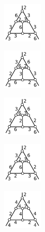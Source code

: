 \documentclass[dvipdfmx]{interact}
\theoremstyle{plain}%
\theoremstyle{definition}
\theoremstyle{remark}
\theoremstyle{problemstyle}
\begin{document}
\begin{figure}[h!tbp]
\begin{minipage}[t]{0.75\textwidth}
\begin{minipage}[t]{0.15\textwidth}
   \includegraphics[width=0.8in, keepaspectratio]{./img/HexahedraWithSphericalFaces/cube/cube_d.png}
   \subcaption{}
   \label{fig:}
  \end{minipage}
 \hspace*{\fill}
  \begin{minipage}[t]{0.15\textwidth}
   \centering
   \includegraphics[width=0.8in, keepaspectratio]{./img/HexahedraWithSphericalFaces/cube/cube_e.png}
   \subcaption{}
   \label{fig:}
  \end{minipage}
 \hspace*{\fill}
\begin{minipage}[t]{0.15\textwidth}
   \centering
   \includegraphics[width=0.8in,
 keepaspectratio]{./img/HexahedraWithSphericalFaces/cube/cube_f.png}
   \subcaption{}
   \label{fig:}
  \end{minipage}
 \hspace*{\fill}
  \begin{minipage}[t]{0.15\textwidth}
   \centering
   \includegraphics[width=0.8in,
   keepaspectratio]{./img/HexahedraWithSphericalFaces/cube/cube_g.png}
   \subcaption{}
   \label{fig:}
  \end{minipage}
  \hspace*{\fill}
  \begin{minipage}[t]{0.15\textwidth}
   \centering
   \includegraphics[width=0.8in, keepaspectratio]{./img/HexahedraWithSphericalFaces/cube/cube_h.png}

\end{minipage}
\end{minipage}
\end{figure}
\end{document}

